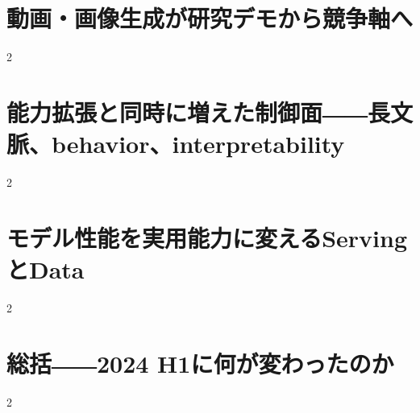 \documentclass[lualatex,a4paper,11pt]{jlreq}
\begin{document}
\clearpage
\section{動画・画像生成が研究デモから競争軸へ}
\label{pkg:generative-media}

\medskip
\begin{multicols}{2}

\end{multicols}


\clearpage
\section{能力拡張と同時に増えた制御面――長文脈、behavior、interpretability}
\label{pkg:safety-control}

\medskip
\begin{multicols}{2}

\end{multicols}


\clearpage
\section{モデル性能を実用能力に変えるServingとData}
\label{pkg:systems-data}

\medskip
\begin{multicols}{2}

\end{multicols}


\clearpage
\section{総括――2024 H1に何が変わったのか}
\label{pkg:conclusion}

\medskip
\begin{multicols}{2}

\end{multicols}


\clearpage
\printbibliography[title={References / Source Notes}]
\end{document}
